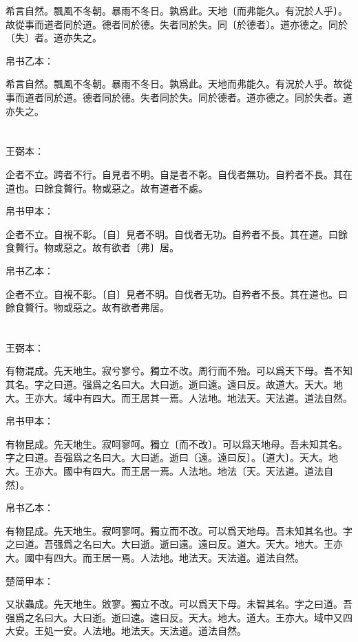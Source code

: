 \documentclass[a5paper]{ctexbook}
\begin{document}
    希言自然。飄風不冬朝。暴雨不冬日。孰爲此。天地〔而弗能久。有況於人乎〕。故從事而道者同於道。德者同於德。失者同於失。同〔於德者〕。道亦德之。同於〔失〕者。道亦失之。

    帛书乙本：

    希言自然。飄風不冬朝。暴雨不冬日。孰爲此。天地而弗能久。有況於人乎。故從事而道者同於道。德者同於德。失者同於失。同於德者。道亦德之。同於失者。道亦失之。

    \chapter{}
    王弼本：

    企者不立。跨者不行。自見者不明。自是者不彰。自伐者無功。自矜者不長。其在道也。曰餘食贅行。物或惡之。故有道者不處。

    
    帛书甲本：

    企者不立。自視不彰。〔自〕見者不明。自伐者无功。自矜者不長。其在道。曰餘食贅行。物或惡之。故有欲者〔弗〕居。

    帛书乙本：

    企者不立。自視不彰。〔自〕見者不明。自伐者无功。自矜者不長。其在道也。曰餘食贅行。物或惡之。故有欲者弗居。

    \chapter{}
    王弼本：

    有物混成。先天地生。寂兮寥兮。獨立不改。周行而不殆。可以爲天下母。吾不知其名。字之曰道。强爲之名曰大。大曰逝。逝曰遠。遠曰反。故道大。天大。地大。王亦大。域中有四大。而王居其一焉。人法地。地法天。天法道。道法自然。

    
    帛书甲本：

    有物昆成。先天地生。寂呵寥呵。獨立〔而不改〕。可以爲天地母。吾未知其名。字之曰道。吾强爲之名曰大。大曰逝。逝曰〔遠。遠曰反〕。〔道大〕。天大。地大。王亦大。國中有四大。而王居一焉。人法地。地法〔天。天法道。道法自然〕。

    帛书乙本：

    有物昆成。先天地生。寂呵寥呵。獨立而不改。可以爲天地母。吾未知其名也。字之曰道。吾强爲之名曰大。大曰逝。逝曰遠。遠曰反。道大。天大。地大。王亦大。國中有四大。而王居一焉。人法地。地法天。天法道。道法自然。

    楚简甲本：

    又狀蟲成。先天地生。敓寥。獨立不改。可以爲天下母。未智其名。字之曰道。吾强爲之名曰大。大曰逝。逝曰遠。遠曰反。天大。地大。道大。王亦大。域中又四大安。王処一安。人法地。地法天。天法道。道法自然。
\end{document}
